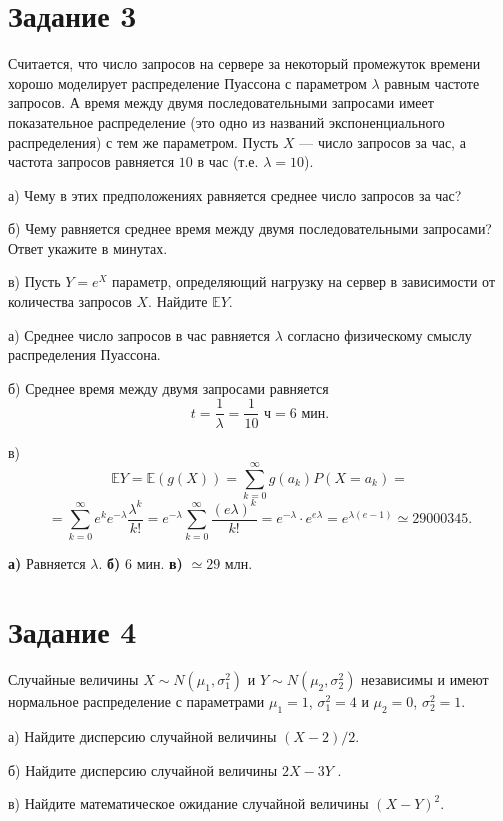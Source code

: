 \documentclass[a4paper,12pt]{article}
\newcommand{\ssolve}{\par\vspace{5pt}\noindent{\bf Решение. }\par}
\newcommand{\aanswer}{\par\vspace{5pt}\noindent{\bf Ответ. }}
\begin{document}
\section*{Задание 3}
Считается, что число запросов на сервере за некоторый промежуток времени хорошо
моделирует распределение Пуассона с параметром $\lambda$ равным частоте запросов.
А время между двумя последовательными запросами имеет показательное распределение (это одно из названий экспоненциального распределения) с тем же параметром.
Пусть $X$ — число запросов за час, а частота запросов равняется $10$ в час (т.е. $\lambda = 10$). \par
а) Чему в этих предположениях равняется среднее число запросов за час? \par
б) Чему равняется среднее время между двумя последовательными запросами? Ответ
укажите в минутах. \par
в) Пусть $Y = e^X$ параметр, определяющий нагрузку на сервер в зависимости от количества запросов $X$. Найдите $\mathbb{E}Y$.
\ssolve
а) Среднее число запросов в час равняется $\lambda$ согласно физическому смыслу распределения Пуассона. \par
б) Среднее время между двумя запросами равняется 
$$t = \frac{1}{\lambda} = \frac{1}{10} \text{ ч} = 6 \text{ мин.} $$ \par
в) $$\mathbb{E}Y = \mathbb{E}(g(X))= \sum_{k=0}^{\infty} g(a_k) P(X=a_k)=$$
$$ = \sum_{k=0}^{\infty} e^k e^{-\lambda}\frac{\lambda^k}{k!}=e^{-\lambda}\sum_{k=0}^{\infty}\frac{(e\lambda)^k}{k!}=e^{-\lambda}\cdot e^{e\lambda}=e^{\lambda(e-1)} \simeq 29 000 345.$$
\aanswer \textbf{а)} Равняется $\lambda$. \textbf{б)} $6$ мин. \textbf{в)} $\simeq 29$ млн.

\section*{Задание 4}
Случайные величины $X \sim N(\mu_1, \sigma_1^2)$ и $Y \sim N(\mu_2, \sigma_2^2)$ независимы и имеют нормальное распределение с параметрами $\mu_1 = 1$, $\sigma_1^2 = 4$ и $\mu_2= 0$, $\sigma_2^2 = 1$. \par
а) Найдите дисперсию случайной величины $(X-2)/2$. \par
б) Найдите дисперсию случайной величины $2X-3Y$ . \par
в) Найдите математическое ожидание случайной величины $(X - Y )^2$.\par
\end{document}
